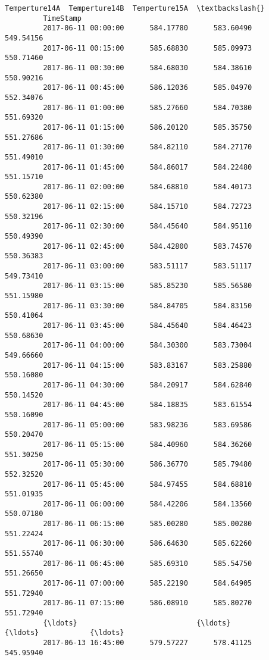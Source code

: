 \documentclass[11pt]{article}
\begin{document}
\begin{Verbatim}[commandchars=\\\{\}]
                              Temperture14A  Temperture14B  Temperture15A  \textbackslash{}
         TimeStamp                                                          
         2017-06-11 00:00:00      584.17780      583.60490      549.54156   
         2017-06-11 00:15:00      585.68830      585.09973      550.71460   
         2017-06-11 00:30:00      584.68030      584.38610      550.90216   
         2017-06-11 00:45:00      586.12036      585.04970      552.34076   
         2017-06-11 01:00:00      585.27660      584.70380      551.69320   
         2017-06-11 01:15:00      586.20120      585.35750      551.27686   
         2017-06-11 01:30:00      584.82110      584.27170      551.49010   
         2017-06-11 01:45:00      584.86017      584.22480      551.15710   
         2017-06-11 02:00:00      584.68810      584.40173      550.62380   
         2017-06-11 02:15:00      584.15710      584.72723      550.32196   
         2017-06-11 02:30:00      584.45640      584.95110      550.49390   
         2017-06-11 02:45:00      584.42800      583.74570      550.36383   
         2017-06-11 03:00:00      583.51117      583.51117      549.73410   
         2017-06-11 03:15:00      585.85230      585.56580      551.15980   
         2017-06-11 03:30:00      584.84705      584.83150      550.41064   
         2017-06-11 03:45:00      584.45640      584.46423      550.68630   
         2017-06-11 04:00:00      584.30300      583.73004      549.66660   
         2017-06-11 04:15:00      583.83167      583.25880      550.16080   
         2017-06-11 04:30:00      584.20917      584.62840      550.14520   
         2017-06-11 04:45:00      584.18835      583.61554      550.16090   
         2017-06-11 05:00:00      583.98236      583.69586      550.20470   
         2017-06-11 05:15:00      584.40960      584.36260      551.30250   
         2017-06-11 05:30:00      586.36770      585.79480      552.32520   
         2017-06-11 05:45:00      584.97455      584.68810      551.01935   
         2017-06-11 06:00:00      584.42206      584.13560      550.07180   
         2017-06-11 06:15:00      585.00280      585.00280      551.22424   
         2017-06-11 06:30:00      586.64630      585.62260      551.55740   
         2017-06-11 06:45:00      585.69310      585.54750      551.26650   
         2017-06-11 07:00:00      585.22190      584.64905      551.72940   
         2017-06-11 07:15:00      586.08910      585.80270      551.72940   
         {\ldots}                            {\ldots}            {\ldots}            {\ldots}   
         2017-06-13 16:45:00      579.57227      578.41125      545.95940   

\end{Verbatim}
\end{document}
